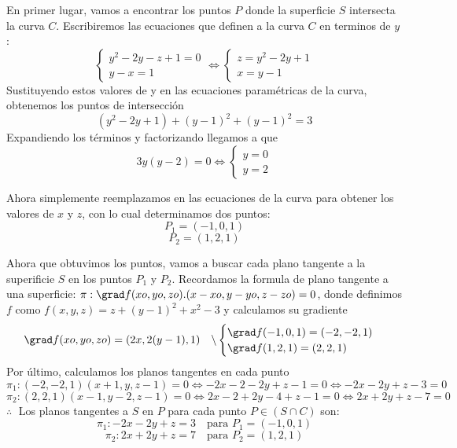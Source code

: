 \begin{solution}
En primer lugar, vamos a encontrar los puntos $P$ donde la superficie $S$ intersecta la curva $C$. Escribiremos las ecuaciones que definen a la curva $C $ en terminos de $y$:
   \[
   \begin{cases}
   y^2 - 2y - z + 1 = 0 \\
   y - x = 1
   \end{cases}
   \iff
   \begin{cases}
    z= y^2 - 2y  + 1 \\
    x =y- 1
   \end{cases}
  \]
Sustituyendo estos valores de y en las ecuaciones paramétricas de la curva, obtenemos los puntos de intersección
 \[
    (y^2 - 2y + 1) + (y - 1)^2 + (y - 1)^2 = 3
 \]
Expandiendo los términos y factorizando llegamos a que
 \[
    3y(y - 2) = 0 \iff 
    \begin{cases}
    y=0\\
    y=2
    \end{cases}
 \]

Ahora simplemente reemplazamos en las ecuaciones de la curva para obtener los valores de $x$ y $z$, con lo cual determinamos dos puntos:
\[
    P_1=(-1,0,1)
 \]
\[
    P_2=(1,2,1)
 \]
\end{solution}
Ahora que obtuvimos los puntos, vamos a buscar cada plano tangente a la superificie $S$ en los puntos $P_1 $ y $ P_2$. Recordamos la formula de plano tangente a una superficie: $\pi: \grad f(xo,yo,zo).(x-xo,y-yo,z-zo)=0$, donde definimos $f$ como $f(x,y,z)=z + (y - 1)^2 + x^2-3$ y calculamos su gradiente
\[
   \grad f(xo,yo,zo)=(2x,2(y-1),1)\quad\backslash 
   \begin{cases}
   \grad f(-1,0,1)=(-2,-2,1)\\
   \grad f(1,2,1)=(2,2,1)
   \end{cases}
 \]
 Por último, calculamos los planos tangentes en cada punto
 \[
 \pi_1: (-2,-2,1)(x+1,y,z-1)=0 \iff -2x-2-2y+z-1=0\iff -2x-2y+z-3=0
 \]
 \[
 \pi_2: (2,2,1)(x-1,y-2,z-1)=0 \iff 2x-2+2y-4+z-1=0\iff 2x+2y+z-7=0
 \]
\newline
$\therefore\;$ Los planos tangentes a $S$ en $P$ para cada punto $P \in (S \cap C)$ son:
\[
\pi_1:-2x-2y+z=3\quad \text {para  }  P_1=(-1,0,1)
 \]
 \[
 \pi_2:2x+2y+z=7\quad \text {para  }  P_2=(1,2,1)
 \]



